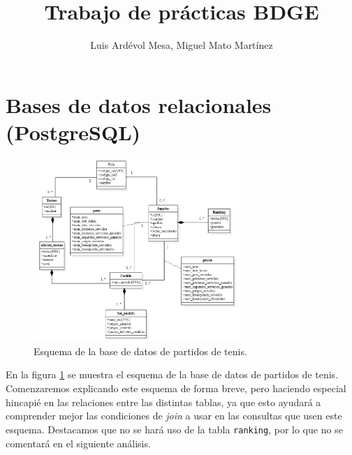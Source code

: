 \documentclass[11pt]{opticajnl}
\title{Trabajo de prácticas BDGE}
\author[1,2,3]{Luis Ardévol Mesa, Miguel Mato Martínez}
\begin{document}
\maketitle


\section{Bases de datos relacionales (PostgreSQL)}

\begin{figure}[H]
  \centering
  \includegraphics[width=0.7\textwidth]{fotos/esquema.png}
  \caption{Esquema de la base de datos de partidos de tenis.}
  \label{fig:schbd}
\end{figure}

En la figura \ref{fig:schbd} se muestra el esquema de la base de datos de partidos de tenis. Comenzaremos explicando este esquema de forma breve, pero haciendo especial hincapié en las relaciones entre las distintas tablas, ya que esto ayudará a comprender mejor las condiciones de \textit{join} a usar en las consultas que usen este esquema. Destacamos que no se hará uso de la tabla \texttt{ranking}, por lo que no se comentará en el siguiente análisis. \\
\end{document}
